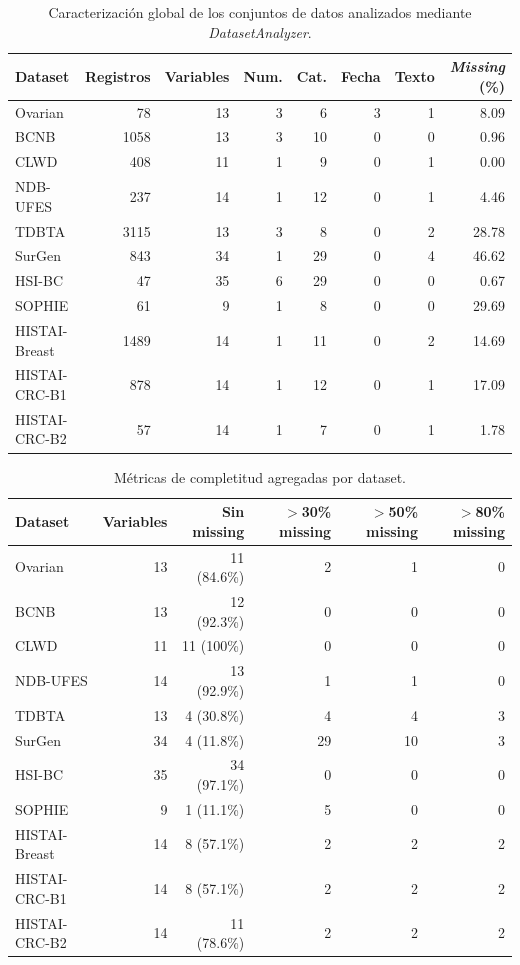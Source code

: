\begin{table}[htbp]
\centering
\caption{Caracterización global de los conjuntos de datos analizados mediante \textit{DatasetAnalyzer}.}
\label{tab:dataset_global_summary}
\small
\setlength{\tabcolsep}{6pt}
\begin{tabular}{lrrrrrrr}
\toprule
Dataset & Registros & Variables & Num. & Cat. & Fecha & Texto & \textit{Missing} (\%) \\
\midrule
Ovarian        & 78    & 13 & 3 & 6  & 3 & 1 & 8.09 \\
BCNB           & 1058  & 13 & 3 & 10 & 0 & 0 & 0.96 \\
CLWD           & 408   & 11 & 1 & 9  & 0 & 1 & 0.00 \\
NDB-UFES       & 237   & 14 & 1 & 12 & 0 & 1 & 4.46 \\
TDBTA          & 3115  & 13 & 3 & 8  & 0 & 2 & 28.78 \\
SurGen           & 843   & 34 & 1 & 29 & 0 & 4 & 46.62 \\
HSI-BC       & 47    & 35 & 6 & 29 & 0 & 0 & 0.67 \\
SOPHIE         & 61    & 9  & 1 & 8  & 0 & 0 & 29.69 \\
HISTAI-Breast  & 1489  & 14  & 1 & 11  & 0 & 2 & 14.69 \\
HISTAI-CRC-B1 & 878 & 14  & 1 & 12  & 0 & 1 & 17.09 \\
HISTAI-CRC-B2 & 57 & 14  & 1 & 7  & 0 & 1 & 1.78 \\
\bottomrule
\end{tabular}
\end{table}

\begin{table}[htbp]
\centering
\caption{Métricas de completitud agregadas por dataset.}
\label{tab:completitud_agregada}
\small
\begin{tabular}{lrrrrr}
\toprule
Dataset & Variables & Sin missing & $>$30\% missing & $>$50\% missing & $>$80\% missing \\
\midrule
Ovarian              & 13 & 11 (84.6\%) &  2 &  1 &  0 \\
BCNB                 & 13 & 12 (92.3\%) &  0 &  0 &  0 \\
CLWD                 & 11 & 11 (100\%)  &  0 &  0 &  0 \\
NDB-UFES             & 14 & 13 (92.9\%) &  1 &  1 &  0 \\
TDBTA                & 13 &  4 (30.8\%) &  4 &  4 &  3 \\
SurGen               & 34 &  4 (11.8\%) & 29 & 10 &  3 \\
HSI-BC             & 35 & 34 (97.1\%) &  0 &  0 &  0 \\
SOPHIE               &  9 &  1 (11.1\%) &  5 &  0 &  0 \\
HISTAI-Breast        & 14 &  8 (57.1\%) &  2 &  2 &  2 \\
HISTAI-CRC-B1 & 14 &  8 (57.1\%) &  2 &  2 &  2 \\
HISTAI-CRC-B2 & 14 & 11 (78.6\%) &  2 &  2 &  2 \\
\bottomrule
\end{tabular}
\end{table}


